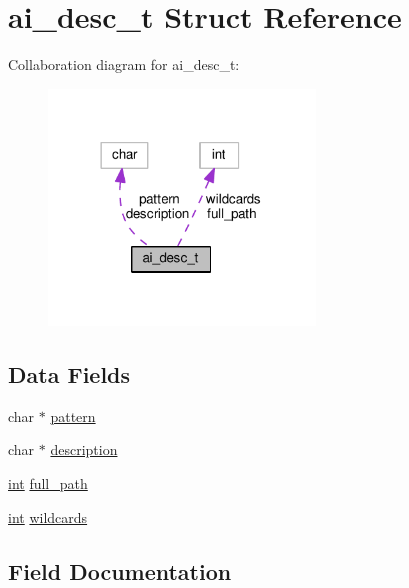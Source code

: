 \hypertarget{structai__desc__t}{}\section{ai\+\_\+desc\+\_\+t Struct Reference}
\label{structai__desc__t}


Collaboration diagram for ai\+\_\+desc\+\_\+t\+:
\nopagebreak
\begin{figure}[H]
\begin{center}
\leavevmode
\includegraphics[width=201pt]{structai__desc__t__coll__graph}
\end{center}
\end{figure}
\subsection*{Data Fields}
\begin{DoxyCompactItemize}
\item 
char $\ast$ \hyperlink{structai__desc__t_a6d8fa38acdb07391178bca525384a526}{pattern}
\item 
char $\ast$ \hyperlink{structai__desc__t_a9357ade1811defeb6105963ae7f16689}{description}
\item 
\hyperlink{pcre_8txt_a42dfa4ff673c82d8efe7144098fbc198}{int} \hyperlink{structai__desc__t_a4bb904b05c7eb1b466466646e2666006}{full\+\_\+path}
\item 
\hyperlink{pcre_8txt_a42dfa4ff673c82d8efe7144098fbc198}{int} \hyperlink{structai__desc__t_a504e39a8861f08b50aa86a875dcd6df6}{wildcards}
\end{DoxyCompactItemize}


\subsection{Field Documentation}
